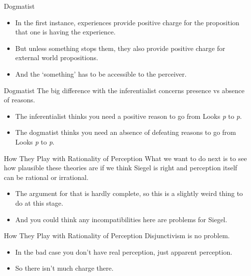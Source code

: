 \documentclass[
  17pt,
  letterpaper,
  ignorenonframetext,
  aspectratio=169,
  handout,
  xcolor={dvipsnames}]{beamer}
\providecommand{\tightlist}{%
  \setlength{\itemsep}{0pt}\setlength{\parskip}{0pt}}\usepackage{longtable,booktabs,array}
\begin{document}
\begin{frame}{Dogmatist}
\protect\hypertarget{dogmatist}{}
\begin{itemize}[<+->]
\tightlist
\item
  In the first instance, experiences provide positive charge for the
  proposition that one is having the experience.
\item
  But unless something stops them, they also provide positive charge for
  external world propositions.
\item
  And the `something' has to be accessible to the perceiver.
\end{itemize}
\end{frame}

\begin{frame}{Dogmatist}
\protect\hypertarget{dogmatist-1}{}
The big difference with the inferentialist concerns presence vs absence
of reasons.

\begin{itemize}[<+->]
\tightlist
\item
  The inferentialist thinks you need a positive reason to go from Looks
  \emph{p} to \emph{p}.
\item
  The dogmatist thinks you need an absence of defeating reasons to go
  from Looks \emph{p} to \emph{p}.
\end{itemize}
\end{frame}

\begin{frame}{How They Play with Rationality of Perception}
\protect\hypertarget{how-they-play-with-rationality-of-perception}{}
What we want to do next is to see how plausible these theories are if we
think Siegel is right and perception itself can be rational or
irrational.

\begin{itemize}[<+->]
\tightlist
\item
  The argument for that is hardly complete, so this is a slightly weird
  thing to do at this stage.
\item
  And you could think any incompatibilities here are problems for
  Siegel.
\end{itemize}
\end{frame}

\begin{frame}{How They Play with Rationality of Perception}
\protect\hypertarget{how-they-play-with-rationality-of-perception-1}{}
Disjunctivism is no problem.

\begin{itemize}[<+->]
\tightlist
\item
  In the bad case you don't have real perception, just apparent
  perception.
\item
  So there isn't much charge there.
\end{itemize}
\end{frame}
\end{document}
